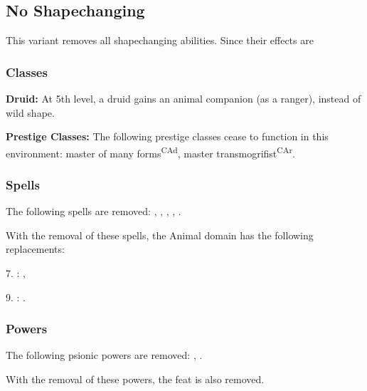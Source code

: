 \subsection{No Shapechanging}
This variant removes all shapechanging abilities. Since their effects are 

\subsubsection{Classes}
\textbf{Druid:} At 5th level, a druid gains an animal companion (as a ranger), instead of wild shape.

\textbf{Prestige Classes:} The following prestige classes cease to function in this environment: master of many forms\textsuperscript{CAd}, master transmogrifist\textsuperscript{CAr}.

\subsubsection{Spells}
The following spells are removed:
,
,
,
,
.

With the removal of these spells, the Animal domain has the following replacements:
\begin{itemize*}
	\item[7.] : ,
	\item[9.] : .
\end{itemize*}


\subsubsection{Powers}
The following psionic powers are removed:
,
.

With the removal of these powers, the  feat is also removed.